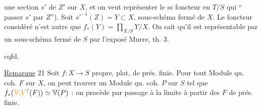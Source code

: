 
une section $s'$ de $Z'$ sur $X$, et on veut représenter le ss foncteur  en $T/S$ qui  `` passer $s'$ par $Z$''). Soit $s'^{-1}(Z)=Y\subset X$, sous-schéma fermé de $X$.  Le foncteur considéré n'est autre que $f_*(Y)=\displaystyle\prod_{X/S}Y/X$. On sait qu'il est représentable par un sous-schéma fermé de $S$ par l'exposé Murre, th. 3.

\begin{center}cqfd.\end{center}

\uline{Remarque} 21 Soit $f:X\longrightarrow S$ propre, plat, de prés. finie. Pour tout Module qu. coh. $F$ sur $X$, on peut trouver un Module qu. coh. $P$ sur $S$ tel que $f_*(\unsure{\mathbb V|V}(F))\simeq \mathbb V(P)$ : on procède par passage à la limite à partir des $F$ de prés. finie.
